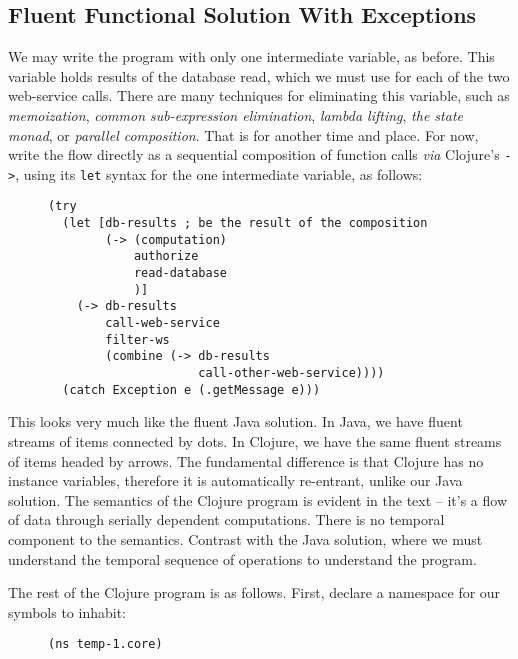 \documentclass[11pt]{article}
\begin{document}
\subsection{Fluent Functional Solution With Exceptions}
\label{sec-3-1}

We may write the program with only one intermediate variable, as
before. This variable holds results of the database read, which we
must use for each of the two web-service calls. There are many
techniques for eliminating this variable, such as \emph{memoization},
\emph{common sub-expression elimination}, \emph{lambda lifting}, \emph{the state
monad}, or \emph{parallel composition}. That is for another time and
place. For now, write the flow directly as a sequential composition
of function calls \emph{via} Clojure's \verb|->|, using its \verb|let|
syntax for the one intermediate variable, as follows:

\begin{figure}[H]
\label{functional-main-1}
\begin{verbatim}
(try
  (let [db-results ; be the result of the composition
        (-> (computation)
            authorize
            read-database
            )]
    (-> db-results
        call-web-service
        filter-ws
        (combine (-> db-results
                     call-other-web-service))))
  (catch Exception e (.getMessage e)))
\end{verbatim}
\end{figure}

This looks very much like the fluent Java solution. In Java, we have
fluent streams of items connected by dots. In Clojure, we have the
same fluent streams of items headed by arrows. The fundamental
difference is that Clojure has no instance variables, therefore it
is automatically re-entrant, unlike our Java solution. The semantics
of the Clojure program is evident in the text -- it's a flow of data
through serially dependent computations. There is no temporal
component to the semantics. Contrast with the Java solution, where
we must understand the temporal sequence of operations to
understand the program.

The rest of the Clojure program is as follows. First, declare a
namespace for our symbols to inhabit:

\begin{figure}[H]
\label{functional-helpers-1}
\begin{verbatim}
(ns temp-1.core)
\end{verbatim}
\end{figure}
\end{document}
